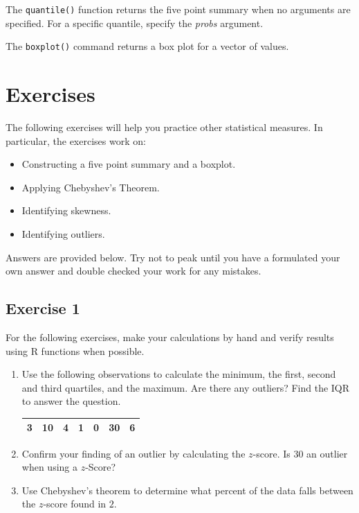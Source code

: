 \documentclass[
  letterpaper,
  DIV=11,
  numbers=noendperiod]{scrreprt}
\begin{document}
The \texttt{quantile()} function returns the five point summary when no
arguments are specified. For a specific quantile, specify the
\emph{probs} argument.

The \texttt{boxplot()} command returns a box plot for a vector of
values.

\hypertarget{exercises-4}{%
\section{Exercises}\label{exercises-4}}

The following exercises will help you practice other statistical
measures. In particular, the exercises work on:

\begin{itemize}
\item
  Constructing a five point summary and a boxplot.
\item
  Applying Chebyshev's Theorem.
\item
  Identifying skewness.
\item
  Identifying outliers.
\end{itemize}

Answers are provided below. Try not to peak until you have a formulated
your own answer and double checked your work for any mistakes.

\hypertarget{exercise-1-8}{%
\subsection*{Exercise 1}\label{exercise-1-8}}

For the following exercises, make your calculations by hand and verify
results using R functions when possible.

\begin{enumerate}
\def\labelenumi{\arabic{enumi}.}
\item
  Use the following observations to calculate the minimum, the first,
  second and third quartiles, and the maximum. Are there any outliers?
  Find the IQR to answer the question.

  \begin{longtable}[]{@{}ccccccc@{}}
  \toprule()
  \endhead
  3 & 10 & 4 & 1 & 0 & 30 & 6 \\
  \bottomrule()
  \end{longtable}
\item
  Confirm your finding of an outlier by calculating the \(z\)-score. Is
  \(30\) an outlier when using a \(z\)-Score?
\item
  Use Chebyshev's theorem to determine what percent of the data falls
  between the \(z\)-score found in \(2\).
\end{enumerate}
\end{document}
